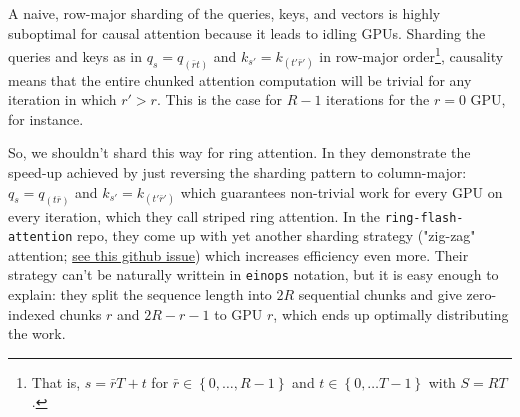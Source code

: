 \documentclass[11pt]{article}
\begin{document}
A naive, row-major sharding of the queries, keys, and vectors is highly suboptimal for causal
attention because it leads to idling GPUs. Sharding the queries and keys as in $ q _{ s } =q _{
(\bar{r}t) } $ and $ k _{ s' } = k _{ (t'\bar{r}') } $ in row-major order\footnote{That is, $ s = \bar{r}T
+ t $ for $ \bar{r} \in \left \{ 0, \ldots , R-1 \right \} $ and $ t \in \left \{ 0, \ldots  T-1
\right \} $ with $ S=RT $.}, causality means that the entire chunked attention computation will be
trivial for any iteration in which $ r'> r $. This is the case for $ R-1 $ iterations for the $ r=0
$ GPU, for instance.

So, we shouldn't shard this way for ring attention. In \cite{brandon2023stripedattentionfasterring}
they demonstrate the speed-up achieved by just reversing the sharding pattern to column-major: $ q
_{ s } =q _{ (t\bar{r}) } $ and $ k _{ s' } = k _{ (t'\bar{r}') } $ which guarantees non-trivial
work for every GPU on every iteration, which they call striped ring attention. In the \texttt{ring-flash-attention} repo, they come up with
yet another sharding strategy ("zig-zag" attention;
\href{https://github.com/zhuzilin/ring-flash-attention/issues/2}{see this github issue}) which
increases efficiency even more. Their strategy can't be naturally writtein in \texttt{einops}
notation, but it is easy enough to explain: they split the sequence length into $ 2R $ sequential
chunks and give zero-indexed chunks $ r $ and $ 2R -r -1 $ to GPU $ r $, which ends up optimally
distributing the work.
\end{document}
